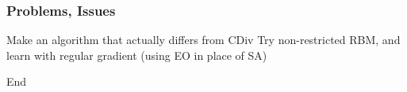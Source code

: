 \documentclass{beamer}
\begin{document}
\begin{frame}
  \frametitle{Problems, Issues}
  Make an algorithm that actually differs from CDiv
  Try non-restricted RBM, and learn with regular gradient
  (using EO in place of SA)
\end{frame}

\begin{frame}
  End

\end{frame}
\end{document}
